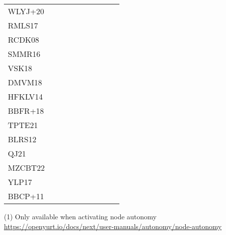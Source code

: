 \documentclass[11pt]{article}
\begin{document}
\begin{center}
\begin{tabular}{llllllllll}
WLYJ+20 &  &  &  &  &  &  &  &  & \\
RMLS17 &  &  &  &  &  &  &  &  & \\
RCDK08 &  &  &  &  &  &  &  &  & \\
SMMR16 &  &  &  &  &  &  &  &  & \\
VSK18 &  &  &  &  &  &  &  &  & \\
DMVM18 &  &  &  &  &  &  &  &  & \\
HFKLV14 &  &  &  &  &  &  &  &  & \\
BBFR+18 &  &  &  &  &  &  &  &  & \\
TPTE21 &  &  &  &  &  &  &  &  & \\
BLRS12 &  &  &  &  &  &  &  &  & \\
QJ21 &  &  &  &  &  &  &  &  & \\
MZCBT22 &  &  &  &  &  &  &  &  & \\
YLP17 &  &  &  &  &  &  &  &  & \\
BBCP+11 &  &  &  &  &  &  &  &  & \\
\end{tabular}
\end{center}


(1) Only available when activating node autonomy \url{https://openyurt.io/docs/next/user-manuals/autonomy/node-autonomy}
\end{document}
